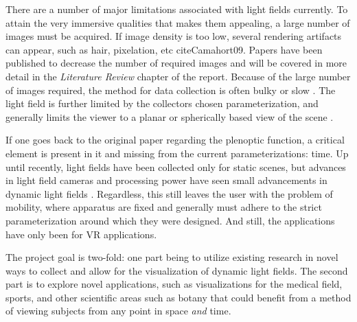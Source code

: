 \documentclass[12pt]{report}
\begin{document}
There are a number of major limitations associated with light fields currently. To attain the very immersive qualities that makes them appealing, a large number of images must be acquired. If image density is too low, several rendering artifacts can appear, such as hair, pixelation, etc cite{Camahort09}. Papers have been published to decrease the number of required images and will be covered in more detail in the \emph{Literature Review} chapter of the report. Because of the large number of images required, the method for data collection is often bulky or slow \cite{lfArchive}. The light field is further limited by the collectors chosen parameterization, and generally limits the viewer to a planar or spherically based view of the scene \cite{Levoy06a}. 

If one goes back to the original paper regarding the plenoptic function, a critical element is present in it and missing from the current parameterizations: time. Up until recently, light fields have been collected only for static scenes, but advances in light field cameras and processing power have seen small advancements in dynamic light fields \cite{Anderson16, lytro}. Regardless, this still leaves the user with the problem of mobility, where apparatus are fixed and generally must adhere to the strict parameterization around which they were designed. And still, the applications have only been for VR applications.

The project goal is two-fold: one part being to utilize existing research in novel ways to collect and allow for the visualization of dynamic light fields. The second part is to explore novel applications, such as visualizations for the medical field, sports, and other scientific areas such as botany that could benefit from a method of viewing subjects from any point in space \emph{and} time.
\end{document}
